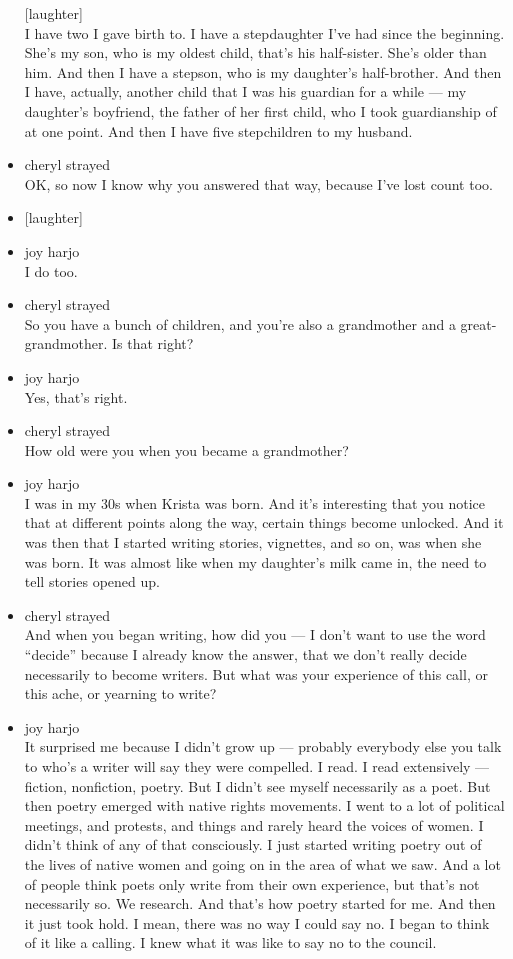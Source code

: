 \begin{itemize}
  {[}laughter{]}\\
  I have two I gave birth to. I have a stepdaughter I've had since the
  beginning. She's my son, who is my oldest child, that's his
  half-sister. She's older than him. And then I have a stepson, who is
  my daughter's half-brother. And then I have, actually, another child
  that I was his guardian for a while --- my daughter's boyfriend, the
  father of her first child, who I took guardianship of at one point.
  And then I have five stepchildren to my husband.
\item
  cheryl strayed\\
  OK, so now I know why you answered that way, because I've lost count
  too.
\item
  {[}laughter{]}
\item
  joy harjo\\
  I do too.
\item
  cheryl strayed\\
  So you have a bunch of children, and you're also a grandmother and a
  great-grandmother. Is that right?
\item
  joy harjo\\
  Yes, that's right.
\item
  cheryl strayed\\
  How old were you when you became a grandmother?
\item
  joy harjo\\
  I was in my 30s when Krista was born. And it's interesting that you
  notice that at different points along the way, certain things become
  unlocked. And it was then that I started writing stories, vignettes,
  and so on, was when she was born. It was almost like when my
  daughter's milk came in, the need to tell stories opened up.
\item
  cheryl strayed\\
  And when you began writing, how did you --- I don't want to use the
  word ``decide'' because I already know the answer, that we don't
  really decide necessarily to become writers. But what was your
  experience of this call, or this ache, or yearning to write?
\item
  joy harjo\\
  It surprised me because I didn't grow up --- probably everybody else
  you talk to who's a writer will say they were compelled. I read. I
  read extensively --- fiction, nonfiction, poetry. But I didn't see
  myself necessarily as a poet. But then poetry emerged with native
  rights movements. I went to a lot of political meetings, and protests,
  and things and rarely heard the voices of women. I didn't think of any
  of that consciously. I just started writing poetry out of the lives of
  native women and going on in the area of what we saw. And a lot of
  people think poets only write from their own experience, but that's
  not necessarily so. We research. And that's how poetry started for me.
  And then it just took hold. I mean, there was no way I could say no. I
  began to think of it like a calling. I knew what it was like to say no
  to the council.


\end{itemize}
